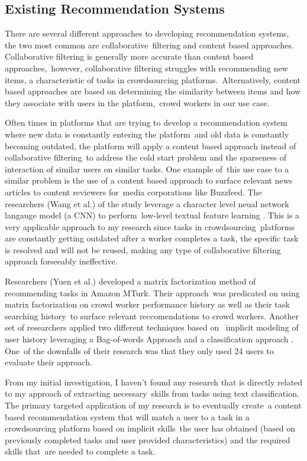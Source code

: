 \documentclass[letterpaper,12pt]{article}
\begin{document}
\subsection{Existing Recommendation Systems}
There are several different approaches to developing recommendation systems, the two most common are collaborative\
filtering and content based approaches. Collaborative filtering is generally more accurate than content based approaches,\
however, collaborative filtering struggles with recommending new items, a characteristic of tasks in crowdsourcing platforms.\
Alternatively, content based approaches are based on determining the similarity between items and how they associate with users in the platform,\
crowd workers in our use case.

Often times in platforms that are trying to develop a recommendation system where new data is constantly entering the platform\
and old data is constantly becoming outdated, the platform will apply a content based approach instead of collaborative filtering\
to address the cold start problem and the sparseness of interaction of similar users on similar tasks. One example of\
this use case to a similar problem is the use of a content based approach to surface relevant news articles to content reviewers for\
media corporations like Buzzfeed. The researchers (Wang et al.) of the study leverage a character level neual network langauge model (a CNN) to perform\
low-level textual feature learning \cite{wang2017dynamic}. This is a very applicable approach to my research since tasks in crowdsourcing\
platforms are constantly getting outdated after a worker completes a task, the specific task is resolved and will not be reused, making
any type of collaborative filtering approach forseeably ineffective.

Researchers (Yuen et al.) developed a matrix factorization method of recommending tasks in Amazon MTurk. Their approach\
was predicated on using matrix factorization on crowd worker performance history as well as their task searching history\
to surface relevant reccomendations to crowd workers. Another set of researchers applied two different techniques based on \
implicit modeling of user history leveraging a Bag-of-words Approach and a classification approach \cite{ambati2011towards}. One\
of the downfalls of their research was that they only used 24 users to evaluate their approach.

From my initial investigation, I haven't found any research that is directly related to my approach of extracting necessary\
skills from tasks using text classification. The primary targeted application of my research is to eventually create\
a content based recommendation system that will match a user to a task in a crowdsourcing platform based on implicit skills\
the user has obtained (based on previously completed tasks and user provided characteristics) and the required skills that\
are needed to complete a task.
\end{document}

